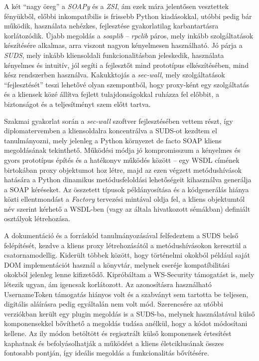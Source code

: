 A két ``nagy öreg'' a \emph{SOAPy} és a \emph{ZSI}, ám ezek mára jelentősen vesztettek fényükből, előbbi inkompatíbilis is frissebb Python kiadásokkal, utóbbi pedig bár működik, használata nehézkes, fejlesztése gyakorlatilag karbantartásra korlátozódik. Újabb megoldás a \emph{soaplib} -- \emph{rpclib} páros, mely inkább szolgáltatások készítésére alkalmas, arra viszont nagyon kényelmesen használható. Jó párja a \emph{SUDS}, mely inkább kliensoldali funkcionalitásban jeleskedik, használata kényelmes és intuitív, jól segíti a fejlesztőt mind prototípus elkészítésében, mind kész rendszerben használva. Kakukktojás a \emph{sec-wall}, mely szolgáltatások ``fejlesztését'' teszi lehetővé olyan szempontból, hogy proxy-ként egy szolgáltatás és a kliensek közé állítva fejlett tulajdonságokkal ruházza fel előbbit, a biztonságot és a teljesítményt szem előtt tartva.

\bigskip

Szakmai gyakorlat során a \emph{sec-wall} szoftver fejlesztésében vettem részt, így diplomatervemben a kliensoldalra koncentrálva a SUDS-ot kezdtem el tanulmányozni, mely jelenleg a Python környezet de facto SOAP kliens megoldásának tekinthető. Működési módja jó kompromisszum a kényelmes és gyors prototípus építés és a hatékonyv működés között -- egy WSDL címének birtokában proxy objektumot hoz létre, majd az ezen végzett metódushívások hatására a Python dinamikus metódusfeloldási lehetőségeit kihasználva generálja a SOAP kéréseket. Az összetett típusok példányosítása és a kódgenerálás hiánya közti ellentmondást a \emph{Factory} tervezési mintával oldja fel, a kliens objektumtól név szerint kérhető a WSDL-ben (vagy az általa hivatkozott sémákban) definiált osztályok létrehozása.

A dokumentáció és a forráskód tanulmányozásával felfedeztem a SUDS belső felépítését, kezdve a kliens proxy létrehozásától a metódushívásokon keresztül a csatornamodellig. Kiderült többek között, hogy történelmi okokból például saját DOM implementációt használ a könyvtár, melynek cseréje kompatíbilitási okokból jelenleg lenne kifizetődő. Kipróbáltam a WS\hyp{}Security támogatást is, mely létezik ugyan, ám igencsak korlátozott. Az azonosításra használható UsernameToken támogatás hiányos volt és a szabványt sem tartotta be teljesen, digitális aláírásra pedig egyáltalán nem volt mód. Szerencsére az utóbbi verziókban került egy plugin megoldás is a SUDS-ba, melynek használatával külső komponensekkel bővíthető a megoldás tudása anélkül, hogy a kódot módosítani kellene. Az ily módon betöltött és regisztrált külső komponensek értesítést kaphatnak és befolyásolhatják a működést a kliens életciklusának összes fontosabb pontján, így ideális megoldás a funkcionalitás bővítésére.

